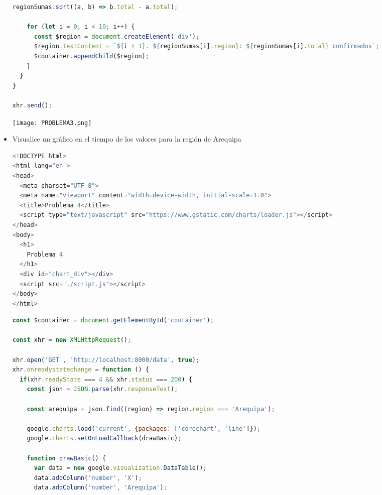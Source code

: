 \documentclass{article}
\begin{document}
\begin{itemize}
\begin{lstlisting}[language=JavaScript, caption=PROBLEMA3-SCRIPT]
    regionSumas.sort((a, b) => b.total - a.total);

    for (let i = 0; i < 10; i++) {
      const $region = document.createElement('div');
      $region.textContent = `${i + 1}. ${regionSumas[i].region}: ${regionSumas[i].total} confirmados`;
      $container.appendChild($region);
    }
  }
}

xhr.send();
            \end{lstlisting}  

            \newline \newline \newline
            \texttt{[image: PROBLEMA3.png]}
            \newline \newline \newline

            \item Visualice un gráfico en el tiempo de los valores para la región de Arequipa
            
            \begin{lstlisting}[language=JavaScript, caption=PROBLEMA4-INDEX]
<!DOCTYPE html>
<html lang="en">
<head>
  <meta charset="UTF-8">
  <meta name="viewport" content="width=device-width, initial-scale=1.0">
  <title>Problema 4</title>
  <script type="text/javascript" src="https://www.gstatic.com/charts/loader.js"></script>
</head>
<body>
  <h1>
    Problema 4
  </h1>
  <div id="chart_div"></div>
  <script src="./script.js"></script>
</body>
</html>
            \end{lstlisting}  

            \begin{lstlisting}[language=JavaScript, caption=PROBLEMA4-SCRIPT]
const $container = document.getElementById('container');

const xhr = new XMLHttpRequest(); 

xhr.open('GET', 'http://localhost:8000/data', true);
xhr.onreadystatechange = function () {
  if(xhr.readyState === 4 && xhr.status === 200) {
    const json = JSON.parse(xhr.responseText);
    
    const arequipa = json.find((region) => region.region === 'Arequipa');

    google.charts.load('current', {packages: ['corechart', 'line']});
    google.charts.setOnLoadCallback(drawBasic);

    function drawBasic() {
      var data = new google.visualization.DataTable();
      data.addColumn('number', 'X');
      data.addColumn('number', 'Arequipa');


\end{lstlisting}
\end{itemize}
\end{document}
